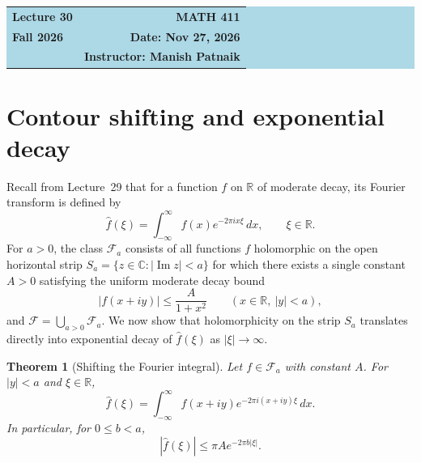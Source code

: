 \documentclass[11pt]{article}
\theoremstyle{plain}
\newtheorem{theorem}{Theorem}[section]
\theoremstyle{definition}
\theoremstyle{boldremark}
\theoremstyle{remark}
\numberwithin{equation}{section}
\newcommand{\C}{\mathbb{C}}
\newcommand{\R}{\mathbb{R}}
\DeclareMathOperator{\Imag}{Im}
\begin{document}
\begin{center}
  \colorbox{lightblue}{%
    \begin{minipage}{0.94\textwidth}
      \vspace{0.55em}
      \begin{tabular*}{\textwidth}{@{\extracolsep{\fill}}lr}
        {\color{courseblue}\bfseries\LARGE Lecture 30} &
        {\color{courseblue}\bfseries\LARGE MATH 411}\\[0.35em]
        \textbf{Fall 2026} & \textbf{Date: Nov 27, 2026}\\
        & \textbf{Instructor: Manish Patnaik}
      \end{tabular*}
      \vspace{0.45em}
    \end{minipage}}
\end{center}

\setcounter{tocdepth}{1}
\tableofcontents
\vspace{0.45em}

\section{Contour shifting and exponential decay}

Recall from Lecture~29 that for a function $f$ on $\R$ of moderate decay,
its Fourier transform is defined by
\[
 \widehat f(\xi) = \int_{-\infty}^{\infty} f(x)e^{-2\pi i x\xi}\,dx,
 \qquad \xi\in\R.
\]
For $a>0$, the class $\mathcal F_a$ consists of all functions $f$
holomorphic on the open horizontal strip
$S_a=\{z\in\C:|\Imag z|<a\}$ for which there exists a single constant
$A>0$ satisfying the uniform moderate decay bound
\[
 |f(x+iy)|\leq\frac{A}{1+x^2}\qquad(x\in\R,\ |y|<a),
\]
and $\mathcal F=\bigcup_{a>0}\mathcal F_a$. We now show that holomorphicity
on the strip $S_a$ translates directly into exponential decay of
$\widehat f(\xi)$ as $|\xi|\to\infty$.

\begin{theorem}[Shifting the Fourier integral]\label{thm:shift}
Let $f\in\mathcal F_a$ with constant $A$. For $|y|<a$ and $\xi\in\R$,
\begin{equation}\label{eq:shift}
 \widehat f(\xi)=\int_{-\infty}^{\infty}
 f(x+iy)e^{-2\pi i(x+iy)\xi}\,dx .
\end{equation}
In particular, for $0\leq b<a$,
\begin{equation}\label{eq:exp-decay}
 |\widehat f(\xi)|\leq\pi A e^{-2\pi b|\xi|}.
\end{equation}
\end{theorem}
\end{document}
